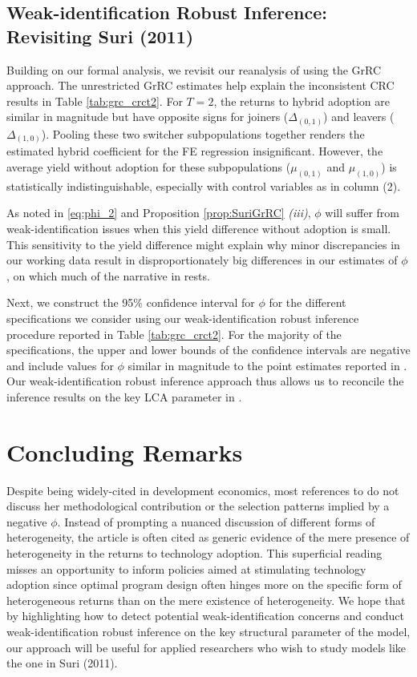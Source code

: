 \documentclass[12pt]{article}
\theoremstyle{plain}
\theoremstyle{definition}
\begin{document}
\subsection{Weak-identification Robust Inference: Revisiting  Suri (2011)}\label{sec:weak_id_results}

Building on our formal analysis, we revisit our reanalysis of \citet{S2011} using the GrRC approach.
The unrestricted GrRC estimates help explain the inconsistent CRC results in Table \ref{tab:grc_crct2}. 
For $T=2$, the returns to hybrid adoption are similar in magnitude but have opposite signs for joiners ($\Delta_{(0,1)}$) and leavers ($\Delta_{(1,0)}$). 
Pooling these two switcher subpopulations together renders the estimated hybrid coefficient for the FE regression insignificant.  
However, the average yield without adoption for these subpopulations ($\mu_{(0,1)}$ and $\mu_{(1,0)}$) is statistically indistinguishable, especially with control variables as in column (2).

As noted in \eqref{eq:phi_2} and Proposition \ref{prop:SuriGrRC} \textit{(iii)}, $\phi$ will suffer from weak-identification issues when this yield difference without adoption is small. 
This sensitivity to the yield difference might explain why minor discrepancies in our working data result in disproportionately big differences in our estimates of $\phi$, on which much of the narrative in \citet{S2011} rests.

Next, we construct the 95\% confidence interval for $\phi$ for the different specifications we consider using our weak-identification robust inference procedure reported in Table \ref{tab:grc_crct2}. 
For the  majority of the specifications, the upper and lower bounds of the confidence intervals are negative and include values for $\phi$ similar in magnitude to the point estimates reported in \citet{S2011}. 
Our weak-identification robust inference approach thus allows us to reconcile the inference results on the key LCA parameter in \citet{S2011}.

\section{Concluding Remarks}\label{sec:discussion}

Despite being widely-cited in development economics, most references to \citet{S2011} do not discuss her methodological contribution or the selection patterns implied by a negative $\phi$. 
Instead of prompting a nuanced discussion of different forms of heterogeneity, the article is often cited as generic evidence of the mere presence of heterogeneity in the returns to technology adoption. 
This superficial reading misses an opportunity to inform policies aimed at stimulating technology adoption since optimal program design often hinges more on the specific form of heterogeneous returns than on the mere existence of heterogeneity. 
We hope that by highlighting how to detect potential weak-identification concerns and conduct weak-identification robust inference on the key structural parameter of the model, our approach will be useful for applied researchers who wish to study models like the one in Suri (2011).
\end{document}
